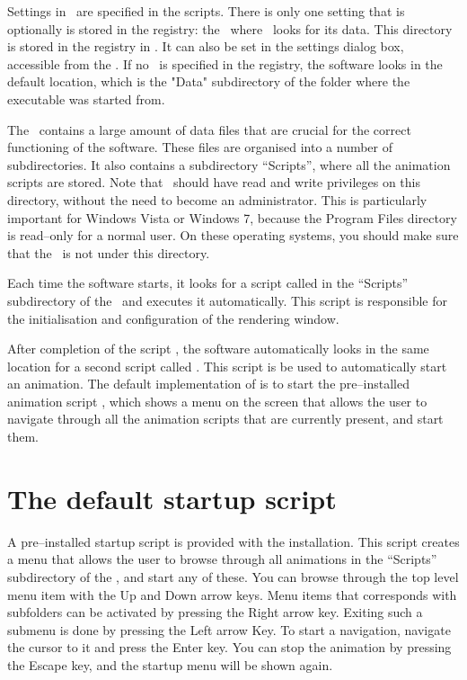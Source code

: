 Settings in \softwarename\ are specified in the scripts. There is only one setting that is optionally is stored in the registry: the \datadir\ where \softwarename\ looks for its data. This directory is stored in the registry in . It can also be set in the settings dialog box, accessible from the  \sourcewin. If no \datadir\ is specified in the registry, the software looks in the default location, which is the "Data" subdirectory of the folder where the executable was started from.


The \datadir\ contains a large amount of data files that are crucial for the correct functioning of the software. These files are organised into a number of subdirectories. It also contains a subdirectory ``Scripts'', where all the animation scripts are stored. Note that \softwarename\ should have read and write privileges on this directory, without the need to become an administrator. This is particularly important for Windows Vista or Windows 7, because the Program Files directory is read--only for a normal user. On these operating  systems, you should make sure that the \datadir\ is not under this directory.

Each time the software starts, it looks for a script called  in the ``Scripts'' subdirectory of the \datadir\ and executes it automatically. This script is responsible for the initialisation and configuration of the rendering window. 

After completion of the script , the software automatically looks in the same location for a second script called  . This script is be used to automatically start an animation. The default implementation of  is to start the pre--installed animation script , which shows a menu on the screen that allows the user to navigate through all the animation scripts that are currently present, and start them.

\section{The default startup script}

A pre--installed startup script  is provided with the installation. This script creates a menu that allows the user to browse through all animations in the ``Scripts'' subdirectory of the \datadir, and start any of these. You can browse through the top level menu item with the Up and Down arrow keys. Menu items that corresponds with subfolders can be activated by pressing the Right arrow key. Exiting such a submenu is done by pressing the Left arrow Key. To start a navigation, navigate the cursor to it and press the Enter key. You can stop the animation by pressing the Escape key, and the startup menu will be shown again.

